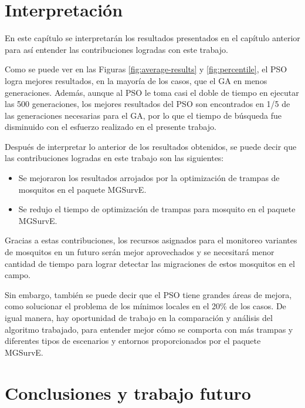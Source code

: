 \chapter{Interpretación}\label{chap:interpretacion}
En este capítulo se interpretarán los resultados presentados en el capítulo
anterior para así entender las contribuciones logradas con este trabajo.

Como se puede ver en las Figuras \ref{fig:average-results} y
\ref{fig:percentile}, el PSO logra mejores resultados, en la mayoría de los
casos, que el GA en menos generaciones. Además, aunque al PSO le toma casi el
doble de tiempo en ejecutar las 500 generaciones, los mejores resultados del
PSO son encontrados en 1/5 de las generaciones necesarias para el GA, por lo
que el tiempo de búsqueda fue disminuido con el esfuerzo realizado en el
presente trabajo.

Después de interpretar lo anterior de los resultados obtenidos, se puede decir
que las contribuciones logradas en este trabajo son las siguientes:

\begin{itemize}
  \item Se mejoraron los resultados arrojados por la optimización de trampas
    de mosquitos en el paquete MGSurvE.
  \item Se redujo el tiempo de optimización de trampas para mosquito en el
    paquete MGSurvE.
\end{itemize}

Gracias a estas contribuciones, los recursos asignados para el monitoreo 
variantes de mosquitos en un futuro serán mejor aprovechados y se necesitará
menor cantidad de tiempo para lograr detectar las migraciones de estos
mosquitos en el campo.

Sin embargo, también se puede decir que
el PSO tiene grandes áreas de mejora, como solucionar el problema de los
mínimos locales en el 20\% de los casos. De igual manera, hay oportunidad de
trabajo en la comparación y análisis del algoritmo trabajado, para entender
mejor cómo se comporta con más trampas y diferentes tipos de escenarios y
entornos proporcionados por el paquete MGSurvE.

\chapter{Conclusiones y trabajo futuro}\label{chap:conclusiones}

